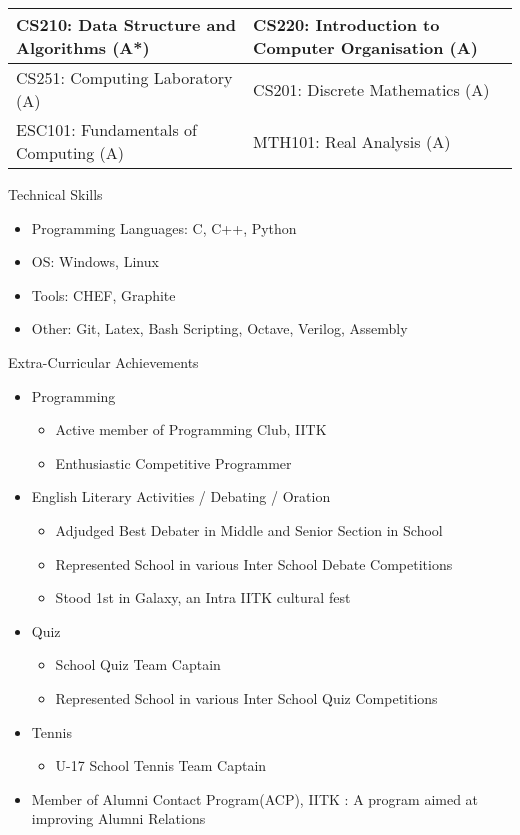 \documentclass{article}
\begin{document}
\newline
\newline
\begin{tabular}{|m{8.5cm} | m{8.5cm}|}
\hline
CS210: Data Structure and Algorithms (A*) & CS220: Introduction to Computer Organisation (A)\\ 
\hline
CS251: Computing Laboratory (A) & CS201: Discrete Mathematics (A)\\
\hline
ESC101: Fundamentals of Computing (A) & MTH101: Real Analysis (A)\\
\hline
\end{tabular}
\newline
\newline
\newline
{\Large Technical Skills}
\begin{itemize}
\item Programming Languages: C, C++, Python
\item OS: Windows, Linux
\item Tools: CHEF, Graphite
\item Other: Git, Latex, Bash Scripting, Octave, Verilog, Assembly
\end{itemize} 
\vspace{10pt}
{\Large Extra-Curricular Achievements}
\begin{itemize}
\item Programming
	\begin{itemize}
	\item Active member of Programming Club, IITK
	\item Enthusiastic Competitive Programmer
	\end{itemize}
\item English Literary Activities / Debating / Oration
	\begin{itemize}
	\item Adjudged Best Debater in Middle and Senior Section in School
	\item Represented School in various Inter School Debate Competitions
	\item Stood 1st in Galaxy, an Intra IITK cultural fest 
	\end{itemize}
\item Quiz
	\begin{itemize}
	\item School Quiz Team Captain
	\item Represented School in various Inter School Quiz Competitions
	\end{itemize}
\item Tennis
	\begin{itemize}
	\item U-17 School Tennis Team Captain
	\end{itemize}
\item Member of Alumni Contact Program(ACP), IITK : A program aimed at improving Alumni Relations
\end{itemize}
\end{document}

